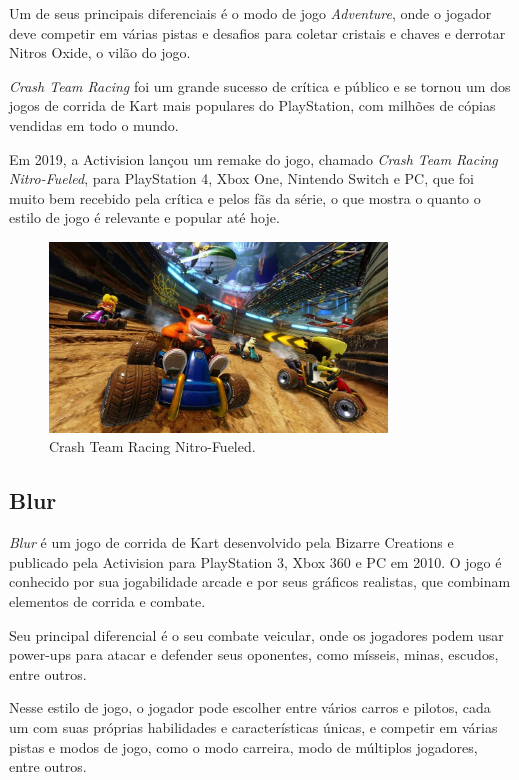 Um de seus principais diferenciais é o modo de jogo \textit{Adventure}, onde o jogador deve competir em várias pistas e desafios para coletar cristais e chaves e derrotar Nitros Oxide, o vilão do jogo.

\textit{Crash Team Racing} foi um grande sucesso de crítica e público e se tornou um dos jogos de corrida de Kart mais populares do PlayStation, com milhões de cópias vendidas em todo o mundo.

Em 2019, a Activision lançou um remake do jogo, chamado \textit{Crash Team Racing Nitro-Fueled}, para PlayStation 4, Xbox One, Nintendo Switch e PC, que foi muito bem recebido pela crítica e pelos fãs da série, o que mostra o quanto o estilo de jogo é relevante e popular até hoje.

\begin{figure}[H]
    \centering
    \includegraphics[width=0.8\textwidth]{figuras/Crash Team Racing Nitro Fueled.jpg}
    \caption{Crash Team Racing Nitro-Fueled. \cite{crashTeamRacingNitroFueled}}
    \label{fig:crash-team-racing-nitro-fueled}
\end{figure}

\subsection{Blur}

\textit{Blur} é um jogo de corrida de Kart desenvolvido pela Bizarre Creations e publicado pela Activision para PlayStation 3, Xbox 360 e PC em 2010. O jogo é conhecido por sua jogabilidade arcade e por seus gráficos realistas, que combinam elementos de corrida e combate.

Seu principal diferencial é o seu combate veicular, onde os jogadores podem usar power-ups para atacar e defender seus oponentes, como mísseis, minas, escudos, entre outros.

Nesse estilo de jogo, o jogador pode escolher entre vários carros e pilotos, cada um com suas próprias habilidades e características únicas, e competir em várias pistas e modos de jogo, como o modo carreira, modo de múltiplos jogadores, entre outros.

